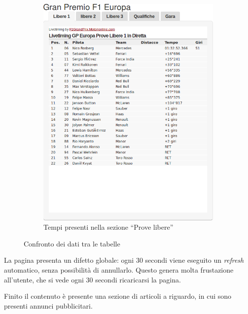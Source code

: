 \begin{figure}[H]
    ~
    \begin{subfigure}[b]{0.45\textwidth}
        \includegraphics[scale=0.25]{res/img/dettagli/tableScoreFP1}
        \caption{Tempi presenti nella sezione ``Prove libere''}
    \end{subfigure}
    \caption{Confronto dei dati tra le tabelle}
\end{figure}

La pagina presenta un difetto globale: ogni 30 secondi viene eseguito un
\textit{refresh} automatico, senza possibilità di annullarlo. Questo genera
molta frustazione all'utente, che si vede ogni 30 secondi ricaricarsi la pagina.

Finito il contenuto è presente una sezione di articoli a riguardo, in cui sono
presenti annunci pubblicitari.
